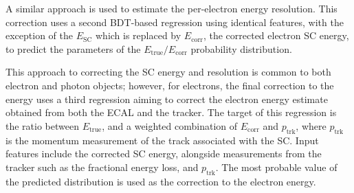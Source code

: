 A similar approach is used to estimate the per-electron energy resolution. This correction uses a second BDT-based regression using identical features, with the exception of the $E_{\mathrm{SC}}$ which is replaced by $E_{\mathrm{corr}}$, the corrected electron SC energy, to predict the parameters of the $E_{\mathrm{true}}/E_{\mathrm{corr}}$ probability distribution. 

This approach to correcting the SC energy and resolution is common to both electron and photon objects; however, for electrons, the final correction to the energy uses a third regression aiming to correct the electron energy estimate obtained from both the ECAL and the tracker. The target of this regression is the ratio between $E_{\mathrm{true}}$, and a weighted combination of $E_{\mathrm{corr}}$ and $p_{\mathrm{trk}}$, where $p_{\mathrm{trk}}$ is the momentum measurement of the track associated with the SC. Input features include the corrected SC energy, alongside measurements from the tracker such as the fractional energy loss, and $p_{\mathrm{trk}}$. The most probable value of the predicted distribution is used as the correction to the electron energy.


